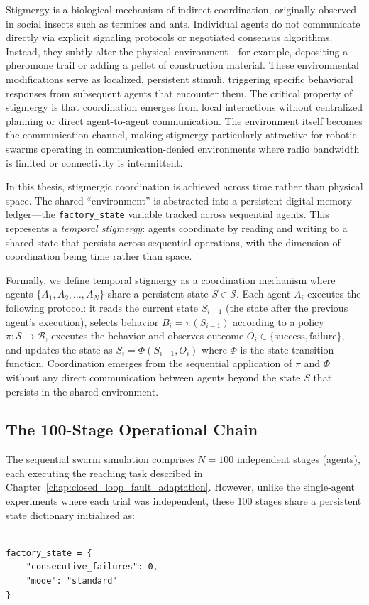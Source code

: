 \documentclass[12pt,a4paper,oneside]{report}
\begin{document}
Stigmergy is a biological mechanism of indirect coordination, originally observed in social insects such as termites and ants. Individual agents do not communicate directly via explicit signaling protocols or negotiated consensus algorithms. Instead, they subtly alter the physical environment---for example, depositing a pheromone trail or adding a pellet of construction material. These environmental modifications serve as localized, persistent stimuli, triggering specific behavioral responses from subsequent agents that encounter them. The critical property of stigmergy is that coordination emerges from local interactions without centralized planning or direct agent-to-agent communication. The environment itself becomes the communication channel, making stigmergy particularly attractive for robotic swarms operating in communication-denied environments where radio bandwidth is limited or connectivity is intermittent.

In this thesis, stigmergic coordination is achieved across time rather than physical space. The shared ``environment'' is abstracted into a persistent digital memory ledger---the \texttt{factory\_state} variable tracked across sequential agents. This represents a \textit{temporal stigmergy}: agents coordinate by reading and writing to a shared state that persists across sequential operations, with the dimension of coordination being time rather than space.

Formally, we define temporal stigmergy as a coordination mechanism where agents $\{A_1, A_2, \ldots, A_N\}$ share a persistent state $S \in \mathcal{S}$. Each agent $A_i$ executes the following protocol: it reads the current state $S_{i-1}$ (the state after the previous agent's execution), selects behavior $B_i = \pi(S_{i-1})$ according to a policy $\pi: \mathcal{S} \rightarrow \mathcal{B}$, executes the behavior and observes outcome $O_i \in \{\text{success}, \text{failure}\}$, and updates the state as $S_i = \Phi(S_{i-1}, O_i)$ where $\Phi$ is the state transition function. Coordination emerges from the sequential application of $\pi$ and $\Phi$ without any direct communication between agents beyond the state $S$ that persists in the shared environment.
\subsection{The 100-Stage Operational Chain}
\label{subsec:the_100_stage_operational_chain}

The sequential swarm simulation comprises $N = 100$ independent stages (agents), each executing the reaching task described in Chapter~\ref{chap:closed_loop_fault_adaptation}. However, unlike the single-agent experiments where each trial was independent, these 100 stages share a persistent state dictionary initialized as:
\begin{verbatim}

factory_state = {
    "consecutive_failures": 0,
    "mode": "standard"
}
\end{verbatim}
\end{document}
